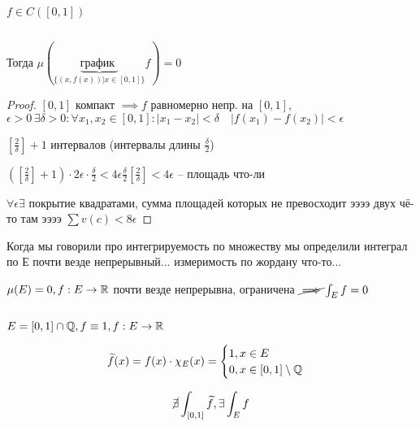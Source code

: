    \begin{remark}
        $f \in C([0, 1])$ 

        \par $ $ 

        Тогда $\mu (\underbrace{\text{график }}_{ \{ (x, f(x)) | x \in [0, 1]\} } f) = 0$
    \end{remark}
    \begin{proof}
        $[0, 1]$ компакт $\implies f$ равномерно непр. на $[0, 1]$, $\epsilon > 0 \,\exists \delta > 0:
        \forall x_1, x_2 \in [0, 1]: |x_1 - x_2| < \delta \quad |f(x_1) - f(x_2)| < \epsilon
        $

        $[\frac{2}{\delta}] + 1$ интервалов (интервалы длины $\frac{\delta}{2}$)
        
        $([\frac{2}{\delta}] + 1) \cdot 2\epsilon \cdot \frac{\delta}{2} < 
        4\epsilon \frac{\delta}{2} [\frac{2}{\delta}] < 4\epsilon
        $ -- площадь что-ли

        $\forall \epsilon \exists$ покрытие квадратами, сумма площадей которых
        не превосходит ээээ двух чё-то там ээээ $\sum v(c) < 8\epsilon$
    \end{proof}

    Когда мы говорили про интегрируемость по множеству мы определили интеграл 
    по Е почти везде непрерывный... измеримость по жордану что-то...

    $\mu(E) = 0, f: E \to \mathbb{R}$ почти везде непрерывна, ограничена 
    $\cancel\implies \int_E f = 0$
    \par $ $

    $E = [0, 1] \cap \mathbb{Q}, f \equiv 1, f: E \to \mathbb{R} $

    $$\widetilde{f}(x) = f(x) \cdot\chi_E(x) = \begin{cases}
        1, x \in E \\
        0, x \in [0, 1] \setminus \mathbb{Q}
    \end{cases}
    $$

    $$\cancel\exists \int_{[0, 1]}\widetilde{f}, \exists \int_E f$$

